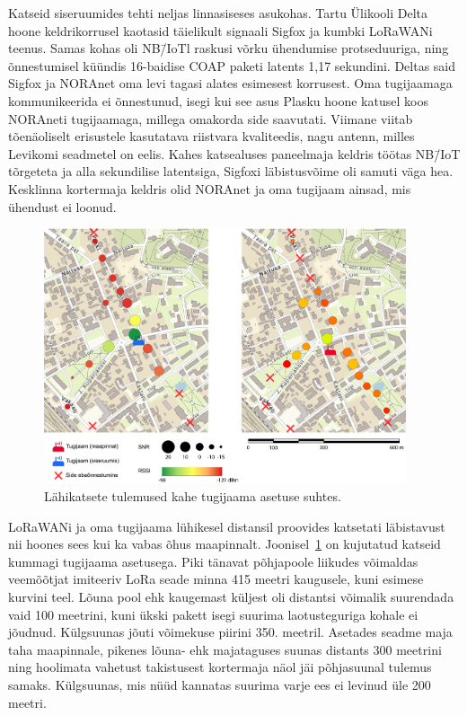 \documentclass[12pt]{article}
\begin{document}
    Katseid siseruumides tehti neljas linnasiseses asukohas.
    Tartu Ülikooli Delta hoone keldrikorrusel kaotasid täielikult signaali Sigfox ja kumbki LoRaWANi teenus.
    Samas kohas oli NB\=/IoTl raskusi võrku ühendumise protseduuriga, ning õnnestumisel küündis 16-baidise COAP paketi latents 1,17 sekundini.
    Deltas said Sigfox ja NORAnet oma levi tagasi alates esimesest korrusest.
    Oma tugijaamaga kommunikeerida ei õnnestunud, isegi kui see asus Plasku hoone katusel koos NORAneti tugijaamaga, millega omakorda side saavutati.
    Viimane viitab tõenäoliselt erisustele kasutatava riistvara kvaliteedis, nagu antenn, milles Levikomi seadmetel on eelis.
    Kahes katsealuses paneelmaja keldris töötas NB\=/IoT tõrgeteta ja alla sekundilise latentsiga, Sigfoxi läbistusvõime oli samuti väga hea.
    Kesklinna kortermaja keldris olid NORAnet ja oma tugijaam ainsad, mis ühendust ei loonud.

    \begin{figure} [h]
        \begin{center}
            \includegraphics[width=0.95\textwidth]{figures/lahikatsed.png}
            \caption{Lähikatsete tulemused kahe tugijaama asetuse suhtes.}
            \label{fig:lahikatsed}
        \end{center}
    \end{figure}

    LoRaWANi ja oma tugijaama lühikesel distansil proovides katsetati läbistavust nii hoones sees kui ka vabas õhus maapinnalt.
    Joonisel~\ref{fig:lahikatsed} on kujutatud katseid kummagi tugijaama asetusega.
    Piki tänavat põhjapoole liikudes võimaldas veemõõtjat imiteeriv LoRa seade minna 415 meetri kaugusele, kuni esimese kurvini teel.
    Lõuna pool ehk kaugemast küljest oli distantsi võimalik suurendada vaid 100 meetrini, kuni ükski pakett isegi suurima laotusteguriga kohale ei jõudnud.
    Külgsuunas jõuti võimekuse piirini 350. meetril.
    Asetades seadme maja taha maapinnale, pikenes lõuna- ehk majataguses suunas distants 300 meetrini ning hoolimata vahetust takistusest kortermaja näol jäi põhjasuunal tulemus samaks.
    Külgsuunas, mis nüüd kannatas suurima varje ees ei levinud üle 200 meetri.
\end{document}
